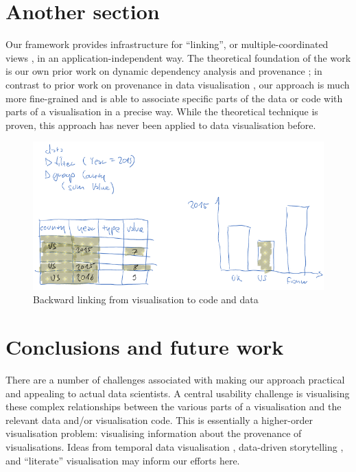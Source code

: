 \cite{becker87,buja91}

\section{Another section}

Our framework provides infrastructure for ``linking'', or multiple-coordinated
views \cite{tobiasz09}, in an application-independent way. The theoretical
foundation of the work is our own prior work on dynamic dependency analysis and
provenance \cite{perera16d, ricciotti17}; in contrast to prior work on
provenance in data visualisation \cite{callahan06}, our approach is much more
fine-grained and is able to associate specific parts of the data or code with
parts of a visualisation in a precise way. While the theoretical technique is
proven, this approach has never been applied to data visualisation before.

\begin{figure}[H]
\includegraphics[scale=0.35]{image/chart-bwd}
\caption{Backward linking from visualisation to code and data}
\end{figure}

\section{Conclusions and future work}

There are a number of challenges associated with making our approach practical
and appealing to actual data scientists. A central usability challenge is
visualising these complex relationships between the various parts of a
visualisation and the relevant data and/or visualisation code. This is
essentially a higher-order visualisation problem: visualising information about
the provenance of visualisations. Ideas from temporal data visualisation
\cite{bach16}, data-driven storytelling \cite{bach18}, and ``literate''
visualisation \cite{wood19} may inform our efforts here.
